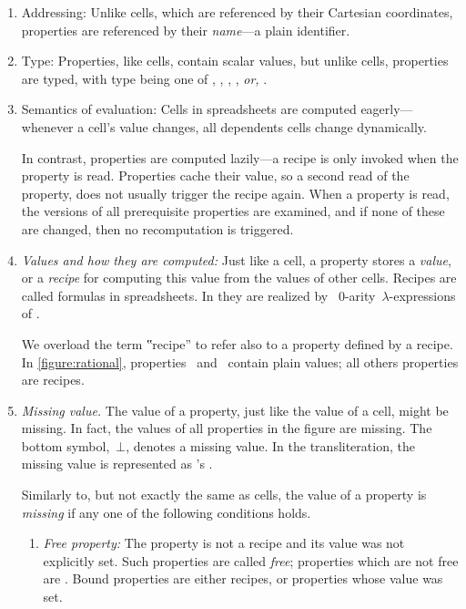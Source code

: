 \begin{enumerate}
  \item{Addressing:} Unlike cells, which are referenced by their Cartesian coordinates,
  properties are referenced by their \emph{name}---a plain identifier.

  \item{Type:} Properties, like cells, contain scalar values, but unlike cells,
  properties are typed, with type being one of , ,
  , , \emph{or,} .

  \item{Semantics of evaluation:} Cells in spreadsheets are computed
  eagerly---whenever a cell's value changes, all dependents cells change
  dynamically.

  In contrast, properties are computed lazily---a recipe is only invoked
  when the property is read. Properties cache their value, so a second read
  of the property, does not usually trigger the recipe again. 
  When a property is read, the versions of all prerequisite
  properties are examined, and if none of these are changed, then no
  recomputation is triggered.

  \item\emph{Values and how they are computed:} Just like a cell, a property
  stores a \emph{value}, or a \emph{recipe} for computing this value from the
  values of other cells.
  Recipes are called formulas in spreadsheets. In \Reap they are realized
  by \Java~$0$-arity~$λ$-expressions of \Java.

  We overload the term ‟recipe” to refer also to a property defined by a recipe.
  In \cref{figure:rational}, properties~ and~ contain plain values; all others properties
  are recipes.

  \item\emph{Missing value.} The value of a property, just like the value
  of a cell, might be missing. In fact, the values of all properties in
  the figure are missing. The bottom symbol,~$⊥$, denotes a missing value.
  In the transliteration, the missing value is represented as \Java's
  .

  Similarly to, but not exactly the same as cells, the value of a property
  is \emph{missing} if any one of the following conditions holds.

  \begin{enumerate}
    \item \emph{Free property:} The property is not a recipe and its
          value was not explicitly set. Such properties are called \emph{free};
          properties which are not free are .
          Bound properties are either recipes, or properties whose value was
          set.


\end{enumerate}
\end{enumerate}
